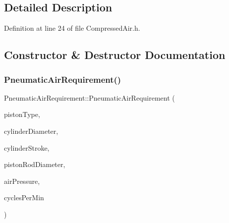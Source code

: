 \subsection{Detailed Description}


Definition at line 24 of file Compressed\+Air.\+h.



\subsection{Constructor \& Destructor Documentation}
\mbox{\label{class_pneumatic_air_requirement_a1255612b8467e69471c097c94eabcf69}} 
\subsubsection{\texorpdfstring{Pneumatic\+Air\+Requirement()}{PneumaticAirRequirement()}\hspace{0.1cm}{\footnotesize\ttfamily [1/6]}}
{\footnotesize\ttfamily Pneumatic\+Air\+Requirement\+::\+Pneumatic\+Air\+Requirement (\begin{DoxyParamCaption}\item[{Piston\+Type}]{piston\+Type,  }\item[{double}]{cylinder\+Diameter,  }\item[{double}]{cylinder\+Stroke,  }\item[{double}]{piston\+Rod\+Diameter,  }\item[{double}]{air\+Pressure,  }\item[{double}]{cycles\+Per\+Min }\end{DoxyParamCaption})}

